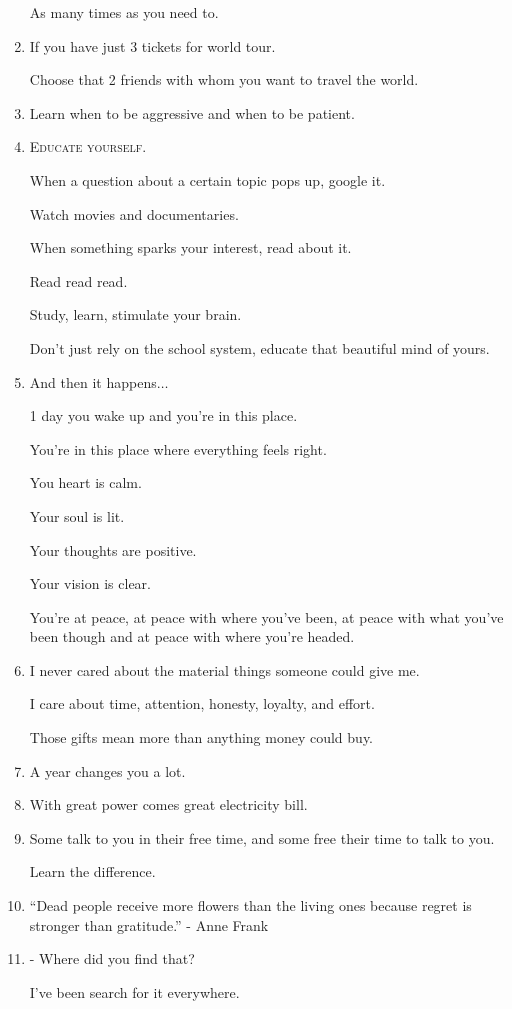 \documentclass{article}
\begin{document}
\begin{enumerate}
	As many times as you need to.
	\item If you have just 3 tickets for world tour.
	
	Choose that 2 friends with whom you want to travel the world.
	\item Learn when to be aggressive and when to be patient.
	\item \textsc{Educate yourself}.
	
	When a question about a certain topic pops up, google it.
	
	Watch movies and documentaries.
	
	When something sparks your interest, read about it.
	
	Read read read.
	
	Study, learn, stimulate your brain.
	
	Don't just rely on the school system, educate that beautiful mind of yours.
	\item And then it happens$\ldots$
	
	1 day you wake up and you're in this place.
	
	You're in this place where everything feels right.
	
	You heart is calm.
	
	Your soul is lit.
	
	Your thoughts are positive.
	
	Your vision is clear.
	
	You're at peace, at peace with where you've been, at peace with what you've been though and at peace with where you're headed.
	\item I never cared about the material things someone could give me.
	
	I care about time, attention, honesty, loyalty, and effort.
	
	Those gifts mean more than anything money could buy.
	\item A year changes you a lot.
	\item With great power comes great electricity bill.
	\item Some talk to you in their free time, and some free their time to talk to you.
	
	Learn the difference.
	\item ``Dead people receive more flowers than the living ones because regret is stronger than gratitude.'' - Anne Frank
	\item - Where did you find that?
	
	I've been search for it everywhere.
	

\end{enumerate}
\end{document}
